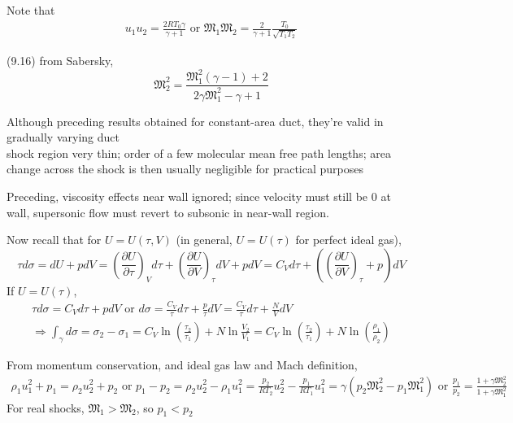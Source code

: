 \documentclass[twoside,landscape,10pt]{amsart}
\theoremstyle{plain}
\theoremstyle{definition}
\theoremstyle{remark}
\theoremstyle{remark}
\begin{document}
\begin{multicols*}{2}
Note that 
\[
\begin{gathered}
  u_1 u_2 = \frac{2RT_0 \gamma }{ \gamma +1} \text{ or } \mathfrak{M}_1\mathfrak{M}_2 = \frac{2}{\gamma +1} \frac{T_0 }{\sqrt{ T_1 T_2 }}
\end{gathered}
\]

(9.16) from Sabersky,
\begin{equation}
  \boxed{ \mathfrak{M}_2^2 = \frac{ \mathfrak{M}_1^2 (\gamma -1) + 2 }{ 2\gamma \mathfrak{M}_1^2 - \gamma + 1 } }
\end{equation}

Although preceding results obtained for constant-area duct, they're valid in gradually varying duct \\
\phantom{Although} shock region very thin; order of a few molecular mean free path lengths; area change across the shock is then usually negligible for practical purposes

Preceding, viscosity effects near wall ignored; since velocity must still be $0$ at wall, supersonic flow must revert to subsonic in near-wall region.\cite{SAHG1998}



Now recall that for $U=U(\tau,V)$ (in general, $U=U(\tau)$ for perfect ideal gas), 
\[
\tau d\sigma = dU + pdV = \left( \frac{ \partial U}{ \partial \tau} \right)_V d\tau + \left( \frac{ \partial U}{ \partial V} \right)_{\tau} dV + pdV = C_V d\tau + \left( \left( \frac{ \partial U}{ \partial V} \right)_{\tau} + p \right) dV
\]
If $U=U(\tau)$, 
\[
\begin{gathered}
  \tau d\sigma = C_V d\tau + p dV \text{ or } d\sigma = \frac{C_V}{\tau} d\tau + \frac{p}{\tau} dV = \frac{C_V}{\tau} d\tau + \frac{N}{V} dV  \\
  \Longrightarrow \int_{\gamma} d\sigma = \sigma_2 - \sigma_1 = C_V \ln{ \left( \frac{\tau_2}{\tau_1} \right) } + N \ln{\frac{ V_2}{V_1}} = C_V \ln{ \left( \frac{\tau_2}{\tau_1} \right) } + N\ln{ \left( \frac{\rho_1}{\rho_2} \right) }
\end{gathered}
\]


From momentum conservation, and ideal gas law and Mach definition,
\[
\begin{gathered}
  \rho_1 u_1^2 + p_1 = \rho_2 u_2^2 + p_2 \text{ or } p_1 - p_2 = \rho_2u_2^2 - \rho_1u_1^2 = \frac{p_2}{RT_2} u_2^2 - \frac{p_1}{RT_1} u_1^2 = \gamma \left( p_2 \mathfrak{M}_2^2 - p_1\mathfrak{M}_1^2 \right) \text{ or } \frac{p_1}{p_2} = \frac{1+\gamma \mathfrak{M}_2^2}{ 1 + \gamma \mathfrak{M}_1^2 }
\end{gathered}
\]
For real shocks, $\mathfrak{M}_1 > \mathfrak{M}_2$, so $p_1 < p_2$


\end{multicols*}
\end{document}
